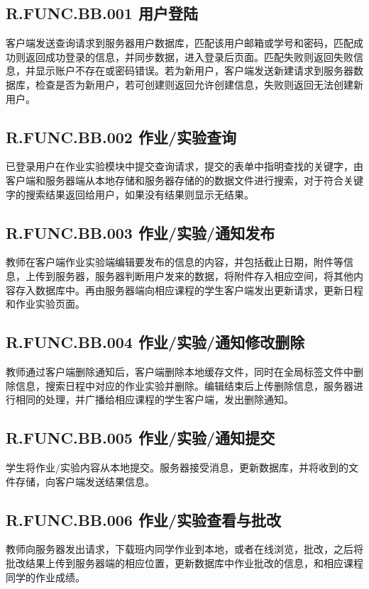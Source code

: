 \subsection{R.FUNC.BB.001   用户登陆}
客户端发送查询请求到服务器用户数据库，匹配该用户邮箱或学号和密码，匹配成功则返回成功登录的信息，并同步数据，进入登录后页面。匹配失败则返回失败信息，并显示账户不存在或密码错误。若为新用户，客户端发送新建请求到服务器数据库，检查是否为新用户，若可创建则返回允许创建信息，失败则返回无法创建新用户。

\subsection{R.FUNC.BB.002   作业/实验查询}
已登录用户在作业实验模块中提交查询请求，提交的表单中指明查找的关键字，由客户端和服务器端从本地存储和服务器存储的的数据文件进行搜索，对于符合关键字的搜索结果返回给用户，如果没有结果则显示无结果。

\subsection{R.FUNC.BB.003   作业/实验/通知发布}
教师在客户端作业实验端编辑要发布的信息的内容，并包括截止日期，附件等信息，上传到服务器，服务器判断用户发来的数据，将附件存入相应空间，将其他内容存入数据库中。再由服务器端向相应课程的学生客户端发出更新请求，更新日程和作业实验页面。

\subsection{R.FUNC.BB.004   作业/实验/通知修改删除}
教师通过客户端删除通知后，客户端删除本地缓存文件，同时在全局标签文件中删除信息，搜索日程中对应的作业实验并删除。编辑结束后上传删除信息，服务器进行相同的处理，并广播给相应课程的学生客户端，发出删除通知。

\subsection{R.FUNC.BB.005   作业/实验/通知提交}
学生将作业/实验内容从本地提交。服务器接受消息，更新数据库，并将收到的文件存储，向客户端发送结果信息。

\subsection{R.FUNC.BB.006   作业/实验查看与批改}
教师向服务器发出请求，下载班内同学作业到本地，或者在线浏览，批改，之后将批改结果上传到服务器端的相应位置，更新数据库中作业批改的信息，和相应课程同学的作业成绩。

